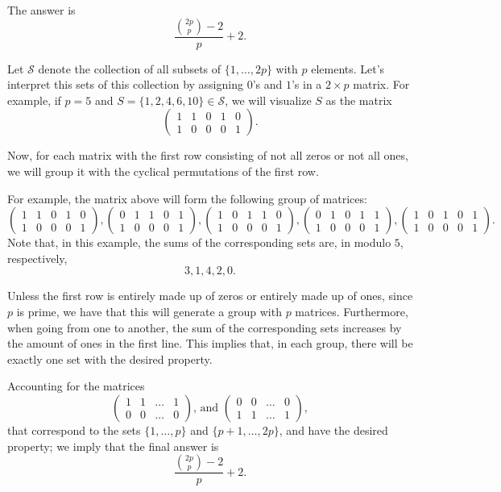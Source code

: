 \begin{sol}{}{}
	The answer is \[
		\frac{\binom{2p}{p} - 2}{p} + 2.
	\]

	Let \(\mathcal S\) denote the collection of all subsets of \(\{1, \dots, 2p\}\) with \(p\) elements. Let's interpret this sets of this collection by assigning \(0\)'s and \(1\)'s in a \(2 \times p\) matrix. For example, if \(p = 5\) and \(S = \{1, 2, 4, 6, 10\} \in \mathcal S\), we will visualize \(S\) as the matrix \[
		\begin{pmatrix}
			1 & 1 & 0 & 1 & 0 \\ 1 & 0 & 0 & 0 & 1
		\end{pmatrix}.
	\]

	Now, for each matrix with the first row consisting of not all zeros or not all ones, we will group it with the cyclical permutations of the first row.
	
	For example, the matrix above will form the following group of matrices:
	\[
		\begin{pmatrix}
			1 & 1 & 0 & 1 & 0 \\ 1 & 0 & 0 & 0 & 1
		\end{pmatrix},
		\begin{pmatrix}
			0 & 1 & 1 & 0 & 1 \\ 1 & 0 & 0 & 0 & 1
		\end{pmatrix},
		\begin{pmatrix}
			1 & 0 & 1 & 1 & 0 \\ 1 & 0 & 0 & 0 & 1
		\end{pmatrix},
		\begin{pmatrix}
			0 & 1 & 0 & 1 & 1 \\ 1 & 0 & 0 & 0 & 1
		\end{pmatrix},
		\begin{pmatrix}
			1 & 0 & 1 & 0 & 1 \\ 1 & 0 & 0 & 0 & 1
		\end{pmatrix}.
	\]
	Note that, in this example, the sums of the corresponding sets are, in modulo \(5\), respectively, \[
		3, 1, 4, 2, 0.
	\]

	Unless the first row is entirely made up of zeros or entirely made up of ones, since \(p\) is prime, we have that this will generate a group with \(p\) matrices. Furthermore, when going from one to another, the sum of the corresponding sets increases by the amount of ones in the first line. This implies that, in each group, there will be exactly one set with the desired property.

	Accounting for the matrices \[
		\begin{pmatrix}
			1 & 1 & \dots & 1 \\ 0 & 0 & \dots & 0
		\end{pmatrix}\text{, and } 
		\begin{pmatrix}
			0 & 0 & \dots & 0 \\ 1 & 1 & \dots & 1
		\end{pmatrix}, 
		\] that correspond to the sets \(\{1, \dots, p\}\) and \(\{p+1, \dots, 2p\}\), and have the desired property; we imply that the final answer is  \[
			\frac{\binom{2p}{p} - 2}{p} + 2.
		\]

\end{sol}

